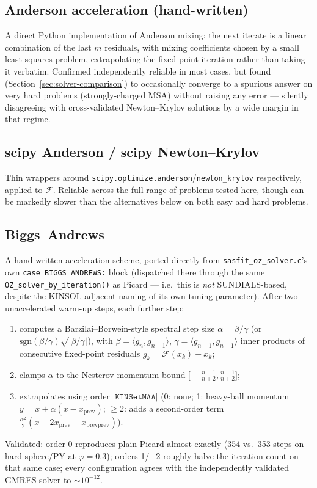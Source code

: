 \documentclass[11pt,a4paper]{article}
\newcommand{\code}[1]{\texttt{#1}}
\begin{document}
\subsection{Anderson acceleration (hand-written)}
A direct Python implementation of Anderson mixing: the next iterate is a
linear combination of the last $m$ residuals, with mixing coefficients chosen
by a small least-squares problem, extrapolating the fixed-point iteration
rather than taking it verbatim. Confirmed independently reliable in most
cases, but found (Section~\ref{sec:solver-comparison}) to occasionally
converge to a spurious answer on very hard problems (strongly-charged MSA)
without raising any error --- silently disagreeing with cross-validated
Newton--Krylov solutions by a wide margin in that regime.

\subsection{scipy Anderson / scipy Newton--Krylov}
Thin wrappers around \code{scipy.optimize.anderson}/\code{newton\_krylov}
respectively, applied to $\mathcal{F}$. Reliable across the full range of
problems tested here, though can be markedly slower than the alternatives
below on both easy and hard problems.

\subsection{Biggs--Andrews \cite{BiggsAndrews1997}}
\label{sec:biggs-andrews}
A hand-written acceleration scheme, ported directly from
\code{sasfit\_oz\_solver.c}'s own \code{case BIGGS\_ANDREWS:} block (dispatched
there through the same \code{OZ\_solver\_by\_iteration()} as Picard --- i.e.\
this is \emph{not} SUNDIALS-based, despite the KINSOL-adjacent naming of its
own tuning parameter). After two unaccelerated warm-up steps, each further
step:
\begin{enumerate}[nosep]
  \item computes a Barzilai--Borwein-style spectral step size
    $\alpha=\beta/\gamma$ (or $\mathrm{sgn}(\beta/\gamma)\sqrt{|\beta/\gamma|}$),
    with $\beta=\langle g_n,g_{n-1}\rangle$, $\gamma=\langle g_{n-1},g_{n-1}\rangle$
    inner products of consecutive fixed-point residuals $g_k=\mathcal{F}(x_k)-x_k$;
  \item clamps $\alpha$ to the Nesterov momentum bound $\big[-\tfrac{n-1}{n+2},\tfrac{n-1}{n+2}\big]$;
  \item extrapolates using order $|{\code{KINSetMAA}}|$ (0: none; 1: heavy-ball
    momentum $y=x+\alpha(x-x_{\mathrm{prev}})$; $\ge$2: adds a second-order term
    $\tfrac{\alpha^2}{2}(x-2x_{\mathrm{prev}}+x_{\mathrm{prevprev}})$).
\end{enumerate}
Validated: order 0 reproduces plain Picard almost exactly (354 vs.\ 353 steps
on hard-sphere/PY at $\varphi=0.3$); orders 1/$-$2 roughly halve the iteration
count on that same case; every configuration agrees with the independently
validated GMRES solver to $\sim10^{-12}$.
\end{document}
